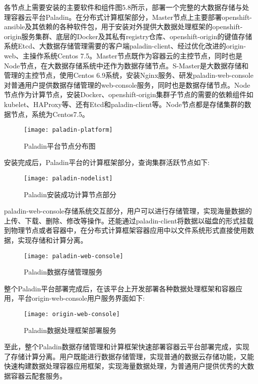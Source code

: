 各节点上需要安装的主要软件和组件图5.8所示，部署一个完整的大数据存储与处理容器云平台Paladin。在分布式计算框架部分，Master节点上主要部署openshift-ansible及其依赖的各种软件包，用于安装对外提供大数据处理框架的openshift-origin服务集群、底层的Docker及其私有registry仓库、openshift-origin的键值存储系统Etcd、大数据存储管理需要的客户端paladin-client、经过优化改进的origin-web、主操作系统Centos 7.5。Master节点既作为容器云的主控节点，同时也是Node节点，在大数据存储系统中还作为数据存储节点。S-Master是大数据存储和管理的主控节点，使用Centos 6.9系统，安装Nginx服务、研发paladin-web-console对普通用户提供数据存储管理的web-console服务，同时也是数据存储节点。Node节点作为计算节点，安装Docker、openshift-origin集群子节点的需要的依赖组件如kubelet、HAProxy等、还有Etcd和paladin-client等。Node节点都是存储集群的数据节点，系统为Centos7.5。
\begin{figure}[H] %
	\centering
	\texttt{[image: paladin-platform]}
	\caption{Paladin平台节点分布图}
\end{figure}

安装完成后，Paladin平台的计算框架部分，查询集群活跃节点如下:
\begin{figure}[H] %
	\centering
	\texttt{[image: paladin-nodelist]}
	\caption{Paladin安装成功计算节点部分}
\end{figure}

paladin-web-console存储系统交互部分，用户可以进行存储管理，实现海量数据的上传、下载、删除、修改等操作。还能通过paladin-client将数据以磁盘的形式挂载到物理节点或者容器中，在分布式计算框架容器应用中以文件系统形式直接使用数据，实现存储和计算分离。
\begin{figure}[H] %
	\centering
	\texttt{[image: paladin-web-console]}
	\caption{Paladin数据存储管理服务}
\end{figure}

整个Paladin平台部署完成后，在该平台上开发部署各种数据处理框架和容器应用，平台origin-web-console用户服务界面如下:
\begin{figure}[H] %
	\centering
	\texttt{[image: origin-web-console]}
	\caption{Paladin数据处理框架部署服务}
\end{figure}

至此，整个Paladin数据存储管理和计算框架快速部署容器云平台部署完成，实现了存储计算分离。用户既能进行数据存储管理，实现普通的数据云存储功能，又能快速构建数据处理容器应用框架，实现海量数据处理，为普通用户提供优秀的大数据容器云配套服务。

